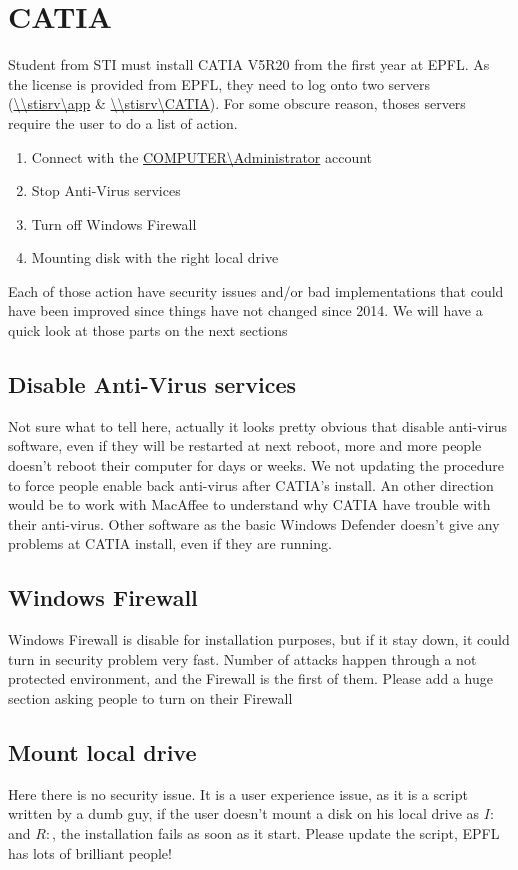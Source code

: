 \documentclass[../main.tex]{subfiles}
\begin{document}
	\section{CATIA}
	
	Student from STI must install CATIA V5R20 from the first year at EPFL. As the license is provided from EPFL, they need to log onto two servers (\url{\\stisrv\app} \& \url{\\stisrv\CATIA}). For some obscure reason, thoses servers require the user to do a list of action. 
	\begin{enumerate}
		\item Connect with the \url{COMPUTER\Administrator} account
		\item Stop Anti-Virus services
		\item Turn off Windows Firewall
		\item Mounting disk with the right local drive
	\end{enumerate}
	Each of those action have security issues and/or bad implementations that could have been improved since things have not changed since 2014. We will have a quick look at those parts on the next sections

	\subsection{Disable Anti-Virus services}
	Not sure what to tell here, actually it looks pretty obvious that disable anti-virus software, even if they will be restarted at next reboot, more and more people doesn't reboot their computer for days or weeks. We not updating the procedure to force people enable back anti-virus after CATIA's install. 
	An other direction would be to work with MacAffee to understand why CATIA have trouble with their anti-virus. Other software as the basic Windows Defender doesn't give any problems at CATIA install, even if they are running.
	
	\subsection{Windows Firewall}
	Windows Firewall is disable for installation purposes, but if it stay down, it could turn in security problem very fast. Number of attacks happen through a not protected environment, and the Firewall is the first of them. Please add a huge section asking people to turn on their Firewall
	
	\subsection{Mount local drive}
	Here there is no security issue. It is a user experience issue, as it is a script written by a dumb guy, if the user doesn't mount a disk on his local drive as $I:$ and $R:$, the installation fails as soon as it start. Please update the script, EPFL has lots of brilliant people!
\end{document}

